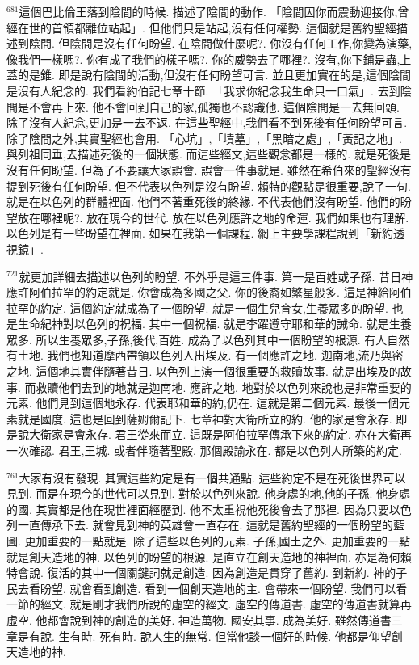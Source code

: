 \documentclass{book}
\begin{document}
$^{681}$這個巴比倫王落到陰間的時候.
描述了陰間的動作.
「陰間因你而震動迎接你,曾經在世的首領都離位站起」.
但他們只是站起,沒有任何權勢.
這個就是舊約聖經描述到陰間.
但陰間是沒有任何盼望.
在陰間做什麼呢?.
你沒有任何工作,你變為演藥,像我們一樣嗎?.
你有成了我們的樣子嗎?.
你的威勢去了哪裡?.
沒有,你下鋪是蟲,上蓋的是錐.
即是說有陰間的活動,但沒有任何盼望可言.
並且更加實在的是,這個陰間是沒有人紀念的.
我們看約伯記七章十節.
「我求你紀念我生命只一口氣」.
去到陰間是不會再上來.
他不會回到自己的家,孤獨也不認識他.
這個陰間是一去無回頭.
除了沒有人紀念,更加是一去不返.
在這些聖經中,我們看不到死後有任何盼望可言.
除了陰間之外,其實聖經也會用.
「心坑」,「墳墓」,「黑暗之處」,「黃記之地」.
與列祖同垂,去描述死後的一個狀態.
而這些經文,這些觀念都是一樣的.
就是死後是沒有任何盼望.
但為了不要讓大家誤會.
誤會一件事就是.
雖然在希伯來的聖經沒有提到死後有任何盼望.
但不代表以色列是沒有盼望.
賴特的觀點是很重要,說了一句.
就是在以色列的群體裡面.
他們不著重死後的終緣.
不代表他們沒有盼望.
他們的盼望放在哪裡呢?.
放在現今的世代.
放在以色列應許之地的命運.
我們如果也有理解.
以色列是有一些盼望在裡面.
如果在我第一個課程.
網上主要學課程說到「新約透視鏡」.

$^{721}$就更加詳細去描述以色列的盼望.
不外乎是這三件事.
第一是百姓或子孫.
昔日神應許阿伯拉罕的約定就是.
你會成為多國之父.
你的後裔如繁星般多.
這是神給阿伯拉罕的約定.
這個約定就成為了一個盼望.
就是一個生兒育女,生養眾多的盼望.
也是生命紀神對以色列的祝福.
其中一個祝福.
就是李躍遵守耶和華的誡命.
就是生養眾多.
所以生養眾多,子孫,後代,百姓.
成為了以色列其中一個盼望的根源.
有人自然有土地.
我們也知道摩西帶領以色列人出埃及.
有一個應許之地.
迦南地,流乃與密之地.
這個地其實伴隨著昔日.
以色列上演一個很重要的救贖故事.
就是出埃及的故事.
而救贖他們去到的地就是迦南地.
應許之地.
地對於以色列來說也是非常重要的元素.
他們見到這個地永存.
代表耶和華的約,仍在.
這就是第二個元素.
最後一個元素就是國度.
這也是回到薩姆爾記下.
七章神對大衛所立的約.
他的家是會永存.
即是說大衛家是會永存.
君王從來而立.
這既是阿伯拉罕傳承下來的約定.
亦在大衛再一次確認.
君王,王城.
或者伴隨著聖殿.
那個殿諭永在.
都是以色列人所築的約定.

$^{761}$大家有沒有發現.
其實這些約定是有一個共通點.
這些約定不是在死後世界可以見到.
而是在現今的世代可以見到.
對於以色列來說.
他身處的地,他的子孫.
他身處的國.
其實都是他在現世裡面經歷到.
他不太重視他死後會去了那裡.
因為只要以色列一直傳承下去.
就會見到神的英雄會一直存在.
這就是舊約聖經的一個盼望的藍圖.
更加重要的一點就是.
除了這些以色列的元素.
子孫,國土之外.
更加重要的一點就是創天造地的神.
以色列的盼望的根源.
是直立在創天造地的神裡面.
亦是為何賴特會說.
復活的其中一個關鍵詞就是創造.
因為創造是貫穿了舊約.
到新約.
神的子民去看盼望.
就會看到創造.
看到一個創天造地的主.
會帶來一個盼望.
我們可以看一節的經文.
就是剛才我們所說的虛空的經文.
虛空的傳道書.
虛空的傳道書就算再虛空.
他都會說到神的創造的美好.
神造萬物.
國安其事.
成為美好.
雖然傳道書三章是有說.
生有時.
死有時.
說人生的無常.
但當他談一個好的時候.
他都是仰望創天造地的神.
\end{document}
